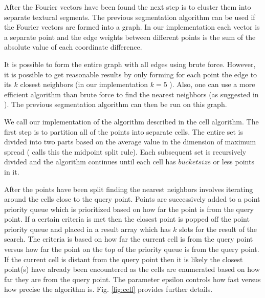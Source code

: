 \documentclass[twocolumn]{article}
\begin{document}
After the Fourier vectors have been found the next step is to
cluster them into separate textural segments. The previous
segmentation algorithm can be used if the Fourier vectors are
formed into a graph. In our implementation each vector is a
separate point and the edge weights between different points
is the sum of the absolute value of each coordinate
difference. 

It is possible to form the entire graph with all edges using
brute force. However, it is possible to get reasonable results
by only forming for each point the edge to its $k$
closest neighbors (in our implementation $k=5$
). Also, one can use a more efficient algorithm \cite{cell} than
brute force to find the nearest neighbors (as suggested in
\cite{intensity}). The previous segmentation algorithm can then be run on
this graph.  

We call our implementation of the algorithm described in \cite{cell}
the cell algorithm. The first step is to partition all of the
points into separate cells. The entire set is divided into two
parts based on the average value in the dimension of maximum
spread (\cite{cell} calls this the midpoint split rule). Each
subsequent set is recursively divided and the algorithm
continues until each cell has $bucket size$ or less
points in it.  

After the points have been split finding the nearest neighbors
involves iterating around the cells close to the query
point. Points are successively added to a point priority queue
which is prioritized based on how far the point is from the
query point. If a certain criteria is met then the closest
point is popped off the point priority queue and placed in a
result array which has $k$ slots for the result of
the search. The criteria is based on how far the current cell
is from the query point versus how far the point on the top of
the priority queue is from the query point. If the current
cell is distant from the query point then it is likely the
closest point(s) have already been encountered as the cells
are enumerated based on how far they are from the query
point. The parameter epsilon controls how fast versus how
precise the algorithm is. Fig. \ref{fig:cell} provides further
details. 
\end{document}
